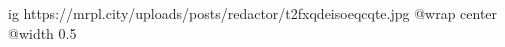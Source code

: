  
 
 
 
 

\ifcmt
  ig https://mrpl.city/uploads/posts/redactor/t2fxqdeisoeqcqte.jpg
  @wrap center
  @width 0.5
\fi
